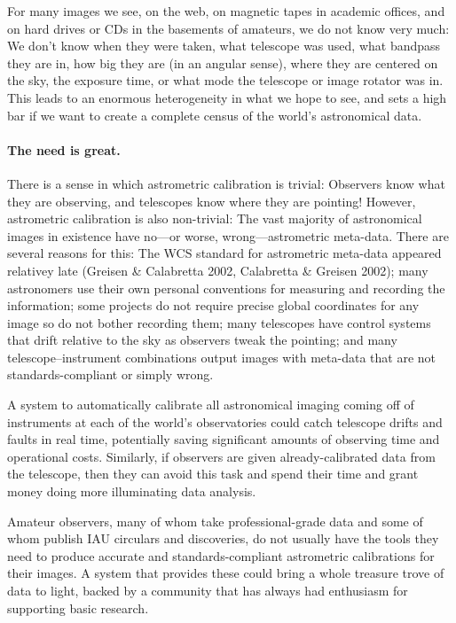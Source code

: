 \documentclass[12pt,preprint]{aastex}
\renewcommand{\%}{\percent}
\begin{document}
For many images we see, on the web, on magnetic tapes in academic
offices, and on hard drives or CDs in the basements of amateurs, we do
not know very much: We don't know when they were taken, what telescope
was used, what bandpass they are in, how big they are (in an angular
sense), where they are centered on the sky, the exposure time, or what
mode the telescope or image rotator was in.  This leads to an enormous
heterogeneity in what we hope to see, and sets a high bar if we want
to create a complete census of the world's astronomical data.

\paragraph{The need is great.}
There is a sense in which astrometric calibration is trivial:
Observers know what they are observing, and telescopes know where they
are pointing!  However, astrometric calibration is also non-trivial:
The vast majority of astronomical images in existence have no---or
worse, wrong---astrometric meta-data.  There are several reasons for
this: The WCS standard for astrometric meta-data appeared relativey
late (Greisen \& Calabretta 2002, Calabretta \& Greisen 2002); many
astronomers use their own personal conventions for measuring and
recording the information; some projects do not require precise global
coordinates for any image so do not bother recording them; many
telescopes have control systems that drift relative to the sky as
observers tweak the pointing; and many telescope--instrument
combinations output images with meta-data that are not
standards-compliant or simply wrong.

A system to automatically calibrate all astronomical
imaging coming off of instruments at each of the world's observatories
could catch telescope drifts and faults in real time, potentially
saving significant amounts of observing time and operational costs.
Similarly, if observers are given already-calibrated data from the
telescope, then they can avoid this task and spend their time and
grant money doing more illuminating data analysis.

Amateur observers, many of whom take professional-grade data and some
of whom publish IAU circulars and discoveries, do not usually have the
tools they need to produce accurate and standards-compliant
astrometric calibrations for their images.  A system that provides
these could bring a whole treasure trove of data to light, backed by a
community that has always had enthusiasm for supporting basic
research.
\end{document}
